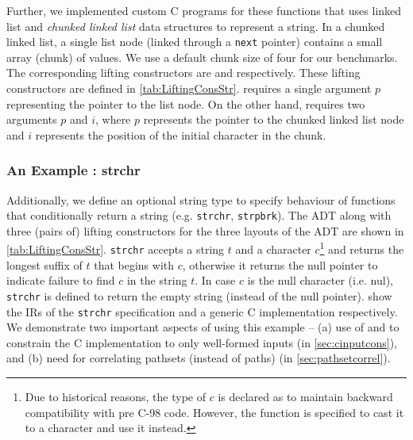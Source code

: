 Further, we implemented custom C programs for these functions that uses linked list
and {\em chunked linked list} data structures to represent a string.
In a chunked linked list, a single list node (linked through a {\tt next} pointer)
contains a small array (chunk) of values.
We use a default chunk size of four for our benchmarks.
The corresponding lifting constructors are 
and  respectively.
These lifting constructors are defined in \cref{tab:LiftingConsStr}.
 requires a single
argument $p$ representing the pointer to the list node.
On the other hand,  requires two arguments $p$
and $i$, where $p$ represents the pointer to the chunked linked list node
and $i$ represents the position of the initial character in the chunk.

\subsubsection{An Example : strchr}
\label{sec:strchrexample}
Additionally, we define an optional string type  to specify
behaviour of functions that conditionally return a string (e.g. {\tt strchr}, {\tt strpbrk}).
The  ADT along with three (pairs of) lifting constructors for the three layouts of the  ADT
are shown in \cref{tab:LiftingConsStr}.
{\tt strchr} accepts a string $t$ and a character $c$\footnote{Due to historical reasons,
the type of $c$ is declared as 
to maintain backward compatibility with pre C-98 code.
However, the function is specified to cast it to a character and use it instead.} and returns
the longest suffix of $t$ that begins with $c$, otherwise it returns the null pointer to indicate
failure to find $c$ in the string $t$.
In case $c$ is the null character (i.e. nul), {\tt strchr} is defined to return the empty string (instead of the null pointer).
 show the IRs of the {\tt strchr} specification and
a generic C implementation respectively.
We demonstrate two important aspects of \toolName{} using this example -- (a) use of \sdef{} and \pre{} to constrain the C implementation
to only well-formed inputs (in \cref{sec:cinputcons}),
and (b) need for correlating pathsets (instead of paths) (in \cref{sec:pathsetcorrel}).

